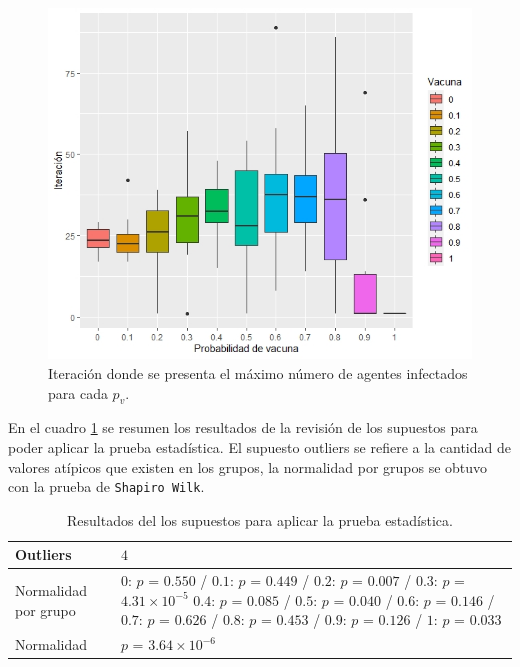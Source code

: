 \documentclass{article}
\begin{document}
\begin{figure} [h!]%
    \centering
    \includegraphics[width=129mm]{Figura2.jpeg} %
    \caption{Iteración donde se presenta el máximo número de agentes infectados para cada $p_v$.}
    \label{Figura2}
\end{figure}

\bigskip
En el cuadro \ref{Cuadro1} se  resumen los resultados de la revisión de los supuestos para poder aplicar la prueba estadística. El supuesto outliers se refiere a la cantidad de valores atípicos que existen en los grupos, la normalidad por grupos se obtuvo con la prueba de \texttt{Shapiro Wilk}.

\begin{table}[ht]
\centering
\caption{Resultados del los supuestos para aplicar la prueba estadística.}
\smallskip

\begin{tabular}{ |p{2.1cm}|p{10.5cm}|}
 \hline
 Outliers & $4$ \\
 \hline
 Normalidad por grupo & $0$: $p$ = $0.550$ / $0.1$: $p$ = $0.449$ / $0.2$: $p$ = $0.007$ / $0.3$: $p$ = $4.31\times 10^{-5}$ $0.4$: $p$ = $0.085$ / $0.5$: $p$ = $0.040$ / $0.6$: $p$ = $0.146$ / $0.7$: $p$ = $0.626$ / $0.8$: $p$ = $0.453$ / $0.9$: $p$ = $0.126$ / $1$: $p$ = $0.033$\\
 \hline
 Normalidad & $p$ = $3.64\times 10^{-6}$ \\
 \hline
\end{tabular}
\label{Cuadro1}
\end{table}
\end{document}
